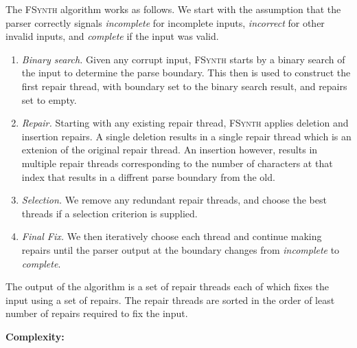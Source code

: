 \documentclass[sigconf,review,anonymous]{acmart}
\makeatletter
\newcounter{todocounter}
\newcommand{\todo}[1]{\marginpar{$|$}\textcolor{red}{\stepcounter{todocounter}\footnote[\thetodocounter]{\textcolor{red}{\textbf{TODO }}\textit{#1}}}}
\renewcommand{\todo}[1]{}
\newcommand{\approach}{\textsc{FSynth}\xspace}
\newcommand{\ddmax}{\textit{DDMax}\xspace}
\newcommand{\brepair}{\textsc{FSynth}\xspace}
\newcommand\letterboxed[1]{%
\setlength{\fboxsep}{0pt}%
  \@tfor\@ii:=#1\do{%
    \fcolorbox{white}{light-gray}{\texttt{\strut\@ii}}%
  }%
}
\makeatother
\begin{document}
The \brepair algorithm works as follows.
We start with the assumption that the parser correctly signals
\emph{incomplete} for incomplete inputs, \emph{incorrect} for other invalid
inputs, and \emph{complete} if the input was valid.\todo{we need to sync these steps with the workflow diagram (\autoref{fig:brepair_flowchart}), and also name/number steps 1,2, ...}

\begin{enumerate}
\item \emph{Binary search.} Given any corrupt input, \brepair starts by a
binary search of the input to determine the parse boundary. This then is used
to construct the first repair thread, with boundary set to the binary search
result, and repairs set to empty.

\item \emph{Repair.} Starting with any existing repair thread, \brepair applies
deletion and insertion repairs. A single deletion results in a single repair
thread which is an extenion of the original repair thread.
An insertion however, results in multiple repair threads corresponding to the
number of characters at that index that results in a diffrent parse boundary from
the old.

\item \emph{Selection.} We remove any redundant repair threads, and choose the best threads if a
selection criterion is supplied.

\item \emph{Final Fix.} We then iteratively choose each thread and continue making repairs
until the parser output at the boundary changes from \emph{incomplete} to
\emph{complete}.
\end{enumerate}

The output of the algorithm is a set of repair threads each of which fixes the
input using a set of repairs. The repair threads are sorted in the order of
least number of repairs required to fix the input.

\noindent
\textbf{Complexity:}\todo{what is the space/time complexity of the \approach, and how does this compare to that of \ddmax. }


%
\end{document}
